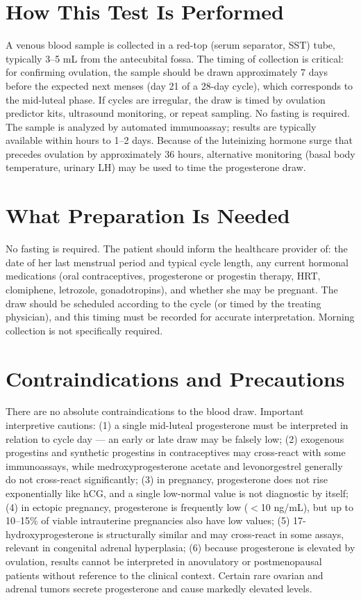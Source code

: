 \section*{How This Test Is Performed}
A venous blood sample is collected in a red-top (serum separator, SST) tube, typically 3--5 mL from the antecubital fossa. The timing of collection is critical: for confirming ovulation, the sample should be drawn approximately 7 days before the expected next menses (day 21 of a 28-day cycle), which corresponds to the mid-luteal phase. If cycles are irregular, the draw is timed by ovulation predictor kits, ultrasound monitoring, or repeat sampling. No fasting is required. The sample is analyzed by automated immunoassay; results are typically available within hours to 1--2 days. Because of the luteinizing hormone surge that precedes ovulation by approximately 36 hours, alternative monitoring (basal body temperature, urinary LH) may be used to time the progesterone draw.

\section*{What Preparation Is Needed}
No fasting is required. The patient should inform the healthcare provider of: the date of her last menstrual period and typical cycle length, any current hormonal medications (oral contraceptives, progesterone or progestin therapy, HRT, clomiphene, letrozole, gonadotropins), and whether she may be pregnant. The draw should be scheduled according to the cycle (or timed by the treating physician), and this timing must be recorded for accurate interpretation. Morning collection is not specifically required.

\section*{Contraindications and Precautions}
There are no absolute contraindications to the blood draw. Important interpretive cautions: (1) a single mid-luteal progesterone must be interpreted in relation to cycle day --- an early or late draw may be falsely low; (2) exogenous progestins and synthetic progestins in contraceptives may cross-react with some immunoassays, while medroxyprogesterone acetate and levonorgestrel generally do not cross-react significantly; (3) in pregnancy, progesterone does not rise exponentially like hCG, and a single low-normal value is not diagnostic by itself; (4) in ectopic pregnancy, progesterone is frequently low ($<$10 ng/mL), but up to 10--15\% of viable intrauterine pregnancies also have low values; (5) 17-hydroxyprogesterone is structurally similar and may cross-react in some assays, relevant in congenital adrenal hyperplasia; (6) because progesterone is elevated by ovulation, results cannot be interpreted in anovulatory or postmenopausal patients without reference to the clinical context. Certain rare ovarian and adrenal tumors secrete progesterone and cause markedly elevated levels.

